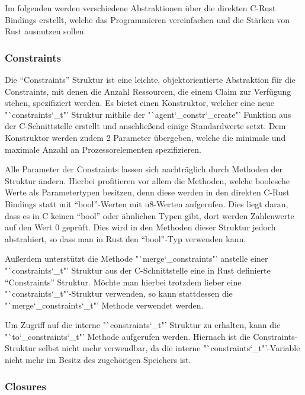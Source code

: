 Im folgenden werden verschiedene Abstraktionen über die direkten C-Rust Bindings erstellt, welche das Programmieren
vereinfachen und die Stärken von Rust ausnutzen sollen.

\subsubsection{Constraints}

Die "`Constraints"' Struktur ist eine leichte, objektorientierte Abstraktion für die Constraints, mit denen die Anzahl Ressourcen, die
einem Claim zur Verfügung stehen, spezifiziert werden.
Es bietet einen Konstruktor, welcher eine neue "`constraints\char`_t"' Struktur mithile der "`agent\char`_constr\char`_create"'
Funktion aus der C-Schnittstelle erstellt und anschließend einige Standardwerte setzt. Dem Konstruktor werden
zudem 2 Parameter übergeben, welche die minimale und maximale Anzahl an Prozessorelementen spezifizieren.

Alle Parameter der Constraints lassen sich nachträglich durch Methoden der Struktur ändern. Hierbei profitieren vor allem die Methoden,
welche boolesche Werte als Parametertypen besitzen, denn diese werden in den direkten C-Rust Bindings statt mit "`bool"'-Werten mit
u8-Werten aufgerufen. Dies liegt daran, dass es in C keinen "`bool"' oder ähnlichen Typen gibt, dort werden Zahlenwerte auf den
Wert 0 geprüft. Dies wird in den Methoden dieser Struktur jedoch abstrahiert, so dass man in Rust den "`bool"'-Typ verwenden kann.

Außerdem unterstützt die Methode "`merge\char`_constraints"' anstelle einer "`constraints\char`_t"' Struktur aus der
C-Schnittstelle eine in Rust definierte "`Constraints"' Struktur. Möchte man hierbei trotzdem lieber eine
"`constraints\char`_t"'-Struktur verwenden, so kann stattdessen die "`merge\char`_constraints\char`_t"' Methode verwendet werden.

Um Zugriff auf die interne "`constraints\char`_t"' Struktur zu erhalten, kann die
"`to\char`_constraints\char`_t"' Methode aufgerufen werden. Hiernach ist die Constraints-Struktur selbst nicht mehr verwendbar,
da die interne "`constraints\char`_t"'-Variable nicht mehr im Besitz des zugehörigen Speichers ist.

\subsubsection{Closures}

